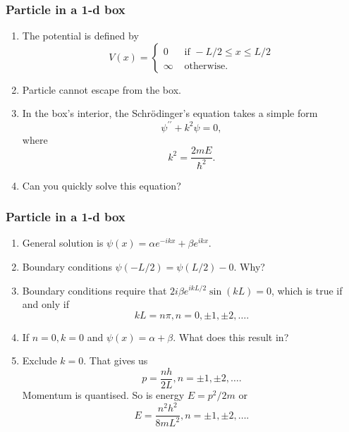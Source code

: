 \documentclass{beamer}
\begin{document}
\begin{frame}
\frametitle{Particle in a 1-d box}
\begin{enumerate}
\item The potential is defined by
\begin{equation}\label{e5}
V(x) = \begin{cases} 0 & \text{ if } -L/2 \le x \le L/2 \\
\infty & \text{ otherwise.}
\end{cases}
\end{equation}
\item Particle cannot escape from the box.
\item In the box's interior, the Schr\"{o}dinger's equation takes a simple
form
\begin{equation}\label{e6}
\psi^{\prime\prime} + k^2\psi = 0,
\end{equation}
where
\begin{equation}\label{e7}
k^2 = \frac{2mE}{\hslash^2}.
\end{equation}
\item Can you quickly solve this equation?
\end{enumerate}
\end{frame}

\begin{frame}
\frametitle{Particle in a 1-d box}
\begin{enumerate}
\item General solution is $\psi(x) = \alpha e^{-ikx} + \beta e^{ikx}$.
\item Boundary conditions $\psi(-L/2) = \psi(L/2) - 0$. Why?
\item Boundary conditions require that $2i\beta e^{ikL/2}\sin(kL) = 0$, which is
true if and only if
\begin{equation}\label{e8}
kL = n\pi, n = 0, \pm 1, \pm 2, \ldots.
\end{equation}
\item If $n = 0, k = 0$ and $\psi(x) = \alpha + \beta$. What does this result 
in?
\item Exclude $k = 0$. That gives us
\begin{equation}\label{e9}
p = \frac{nh}{2L}, n = \pm 1, \pm 2, \ldots.
\end{equation}
Momentum is quantised. So is energy $E = p^2/2m$ or
\begin{equation}\label{e10}
E = \frac{n^2h^2}{8mL^2}, n = \pm 1, \pm 2, \ldots.
\end{equation}
\end{enumerate}
\end{frame}
\end{document}
